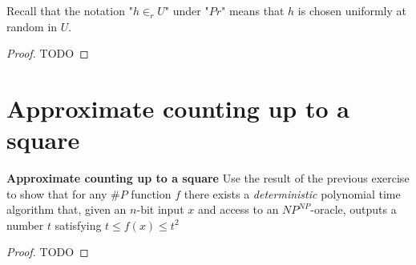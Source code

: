 \documentclass[12pt, a4paper]{article} %
\begin{document}
Recall that the notation "$h \in_r U$" under "$Pr$" means that $h$ is chosen uniformly at random in $U$.

\begin{proof}

  TODO

\end{proof}


\section{Approximate counting up to a square}

\textbf{Approximate counting up to a square} \quad Use the result of the previous exercise to show that for any $\#P$ function $f$ there exists a \textit{deterministic} polynomial time algorithm that, given an $n$-bit input $x$ and access to an $NP^{NP}$-oracle, outputs a number $t$ satisfying $t \leq f(x) \leq t^2$

\begin{proof}

  TODO

\end{proof}
\end{document}
